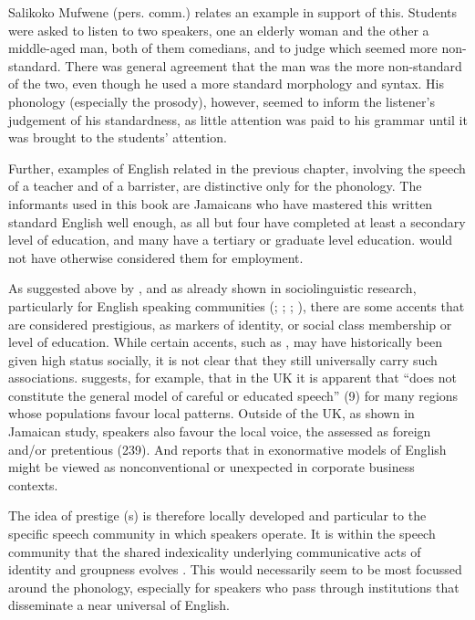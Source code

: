 Salikoko Mufwene (pers. comm.) relates an example in support of this.  Students were asked to listen to two speakers, one an elderly woman and the other a middle-aged man, both of them comedians, and to judge which seemed more non-standard.  There was general agreement that the man was the more non-standard of the two, even though he used a more standard morphology and syntax.  His phonology (especially the prosody), however, seemed to inform the listener’s judgement of his standardness, as little attention was paid to his grammar until it was brought to the students’ attention. 

Further,  examples of  English related in the previous chapter, involving the speech of a teacher and of a barrister, are distinctive only for the phonology.   The informants used in this book are Jamaicans who have mastered this written standard English well enough, as all but four have completed at least a secondary level of education, and many have a tertiary or graduate level education.   would not have otherwise considered them for employment.     

As suggested above by \citet[370]{Gupta2001}, and as already shown in sociolinguistic research, particularly for English speaking communities (\citealt{Hewitt1986}; \citealt{Labov1972}; \citealt{Mugglestone1995}; \citealt{Trudgill1978}), there are some accents that are considered prestigious, as markers of identity, or social class membership or level of education.  While certain accents, such as , may have historically been given high status socially, it is not clear that they still universally carry such associations.  \citet{Milroy2002} suggests, for example, that in the UK it is apparent that  “does not constitute the general model of careful or educated speech” (9) for many regions whose populations favour local patterns.  Outside of the UK, as shown in  Jamaican study, speakers also favour the local voice, the   assessed as foreign and\slash or pretentious (239).  And \citet[47]{Nair-Venugopal2001} reports that in  exonormative models of English might be viewed as nonconventional or unexpected in corporate business contexts.

The idea of prestige (s) is therefore locally developed and particular to the specific speech community in which speakers operate.  It is within the speech community that the shared indexicality underlying communicative acts of identity and groupness evolves \citep[407]{Silverstein1998}.  This would necessarily seem to be most focussed around the phonology, especially for speakers who pass through institutions that disseminate a near universal  of English.  

